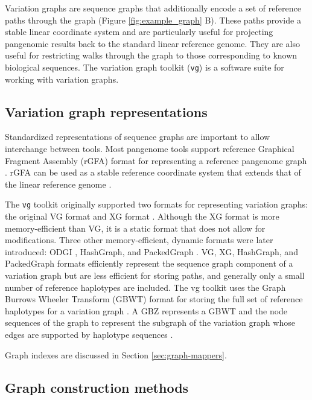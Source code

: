 \documentclass[11pt]{ucscthesis}
\begin{document}
Variation graphs are sequence graphs that additionally encode a set of reference paths through the graph (Figure \ref{fig:example_graph} B).
These paths provide a stable linear coordinate system and are particularly useful for projecting pangenomic results back to the standard linear reference genome.
They are also useful for restricting walks through the graph to those corresponding to known biological sequences.
The variation graph toolkit (\texttt{vg}) is a software suite for working with variation graphs.

\subsection{Variation graph representations}

Standardized representations of sequence graphs are important to allow interchange between tools.
Most pangenome tools support reference Graphical Fragment Assembly (rGFA) format for representing a reference pangenome graph \cite{li_minigraph_2020}. 
rGFA can be used as a stable reference coordinate system that extends that of the linear reference genome \cite{li_minigraph_2020}. 

The \texttt{vg} toolkit originally supported two formats for representing variation graphs: the original VG format and XG format \cite{garrison_vg_2018}.
Although the XG format is more memory-efficient than VG, it is a static format that does not allow for modifications.
Three other memory-efficient, dynamic formats were later introduced: ODGI \cite{guarracino_odgi_2022}, HashGraph, and PackedGraph \cite{eizenga2020efficient}.
VG, XG, HashGraph, and PackedGraph formats efficiently represent the sequence graph component of a variation graph but are less efficient for storing paths, and generally only a small number of reference haplotypes are included.
The vg toolkit uses the Graph Burrows Wheeler Transform (GBWT) format for storing the full set of reference haplotypes for a variation graph \cite{siren_indexes_2020}.
A GBZ represents a GBWT and the node sequences of the graph to represent the subgraph of the variation graph whose edges are supported by haplotype sequences \cite{siren_gbz_2022}.

Graph indexes are discussed in Section \ref{sec:graph-mappers}.

\subsection{Graph construction methods}
\label{sec:graph-construction}
\end{document}
